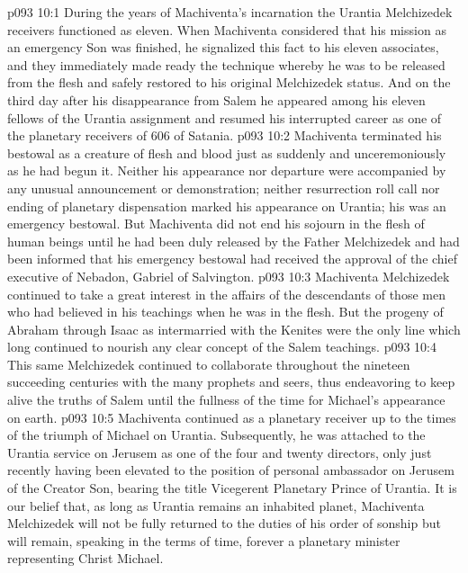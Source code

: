 \vs p093 10:1 During the years of Machiventa’s incarnation the Urantia Melchizedek receivers functioned as eleven. When Machiventa considered that his mission as an emergency Son was finished, he signalized this fact to his eleven associates, and they immediately made ready the technique whereby he was to be released from the flesh and safely restored to his original Melchizedek status. And on the third day after his disappearance from Salem he appeared among his eleven fellows of the Urantia assignment and resumed his interrupted career as one of the planetary receivers of 606 of Satania.
\vs p093 10:2 Machiventa terminated his bestowal as a creature of flesh and blood just as suddenly and unceremoniously as he had begun it. Neither his appearance nor departure were accompanied by any unusual announcement or demonstration; neither resurrection roll call nor ending of planetary dispensation marked his appearance on Urantia; his was an emergency bestowal. But Machiventa did not end his sojourn in the flesh of human beings until he had been duly released by the Father Melchizedek and had been informed that his emergency bestowal had received the approval of the chief executive of Nebadon, Gabriel of Salvington.
\pc \vs p093 10:3 Machiventa Melchizedek continued to take a great interest in the affairs of the descendants of those men who had believed in his teachings when he was in the flesh. But the progeny of Abraham through Isaac as intermarried with the Kenites were the only line which long continued to nourish any clear concept of the Salem teachings.
\vs p093 10:4 This same Melchizedek continued to collaborate throughout the nineteen succeeding centuries with the many prophets and seers, thus endeavoring to keep alive the truths of Salem until the fullness of the time for Michael’s appearance on earth.
\vs p093 10:5 Machiventa continued as a planetary receiver up to the times of the triumph of Michael on Urantia. Subsequently, he was attached to the Urantia service on Jerusem as one of the four and twenty directors, only just recently having been elevated to the position of personal ambassador on Jerusem of the Creator Son, bearing the title Vicegerent Planetary Prince of Urantia. It is our belief that, as long as Urantia remains an inhabited planet, Machiventa Melchizedek will not be fully returned to the duties of his order of sonship but will remain, speaking in the terms of time, forever a planetary minister representing Christ Michael.
